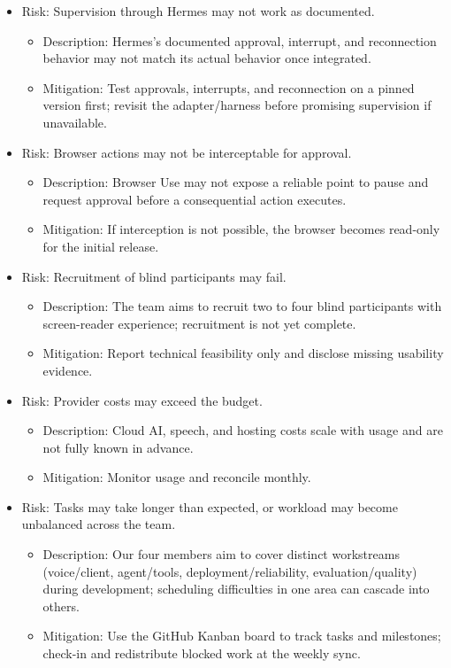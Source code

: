 \documentclass{scrreprt}
\theoremstyle{definition}
\begin{document}
\begin{itemize}
    \item Risk: Supervision through Hermes may not work as documented.
    \begin{itemize}
        \item Description: Hermes's documented approval, interrupt, and reconnection behavior may not match its actual behavior once integrated.
        \item Mitigation: Test approvals, interrupts, and reconnection on a pinned version first; revisit the adapter/harness before promising supervision if unavailable.
    \end{itemize}
    \item Risk: Browser actions may not be interceptable for approval.
    \begin{itemize}
        \item Description: Browser Use may not expose a reliable point to pause and request approval before a consequential action executes.
        \item Mitigation: If interception is not possible, the browser becomes read-only for the initial release.
    \end{itemize}
    \item Risk: Recruitment of blind participants may fail.
    \begin{itemize}
        \item Description: The team aims to recruit two to four blind participants with screen-reader experience; recruitment is not yet complete.
        \item Mitigation: Report technical feasibility only and disclose missing usability evidence.
    \end{itemize}
    \item Risk: Provider costs may exceed the budget.
    \begin{itemize}
        \item Description: Cloud AI, speech, and hosting costs scale with usage and are not fully known in advance.
        \item Mitigation: Monitor usage and reconcile monthly.
    \end{itemize}
    \item Risk: Tasks may take longer than expected, or workload may become unbalanced across the team.
    \begin{itemize}
        \item Description: Our four members aim to cover distinct workstreams (voice/client, agent/tools, deployment/reliability, evaluation/quality) during development; scheduling difficulties in one area can cascade into others.
        \item Mitigation: Use the GitHub Kanban board to track tasks and milestones; check-in and redistribute blocked work at the weekly sync.
    \end{itemize}
\end{itemize}
\end{document}
